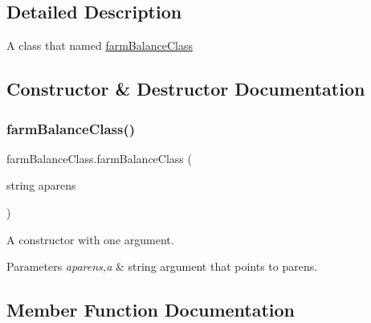 \subsection{Detailed Description}
A class that named \mbox{\hyperlink{classfarm_balance_class}{farm\+Balance\+Class}} 

\subsection{Constructor \& Destructor Documentation}
\mbox{\label{classfarm_balance_class_ae4000127352d82c96afa8c92dfff35fa}} 
\subsubsection{\texorpdfstring{farmBalanceClass()}{farmBalanceClass()}}
{\footnotesize\ttfamily farm\+Balance\+Class.\+farm\+Balance\+Class (\begin{DoxyParamCaption}\item[{string}]{aparens }\end{DoxyParamCaption})\hspace{0.3cm}{\ttfamily [inline]}}



A constructor with one argument. 


\begin{DoxyParams}{Parameters}
{\em aparens,a} & string argument that points to parens. \\
\hline
\end{DoxyParams}


\subsection{Member Function Documentation}
\mbox{\label{classfarm_balance_class_a5788e7256ac5b931b62fadcdb5403628}} 
